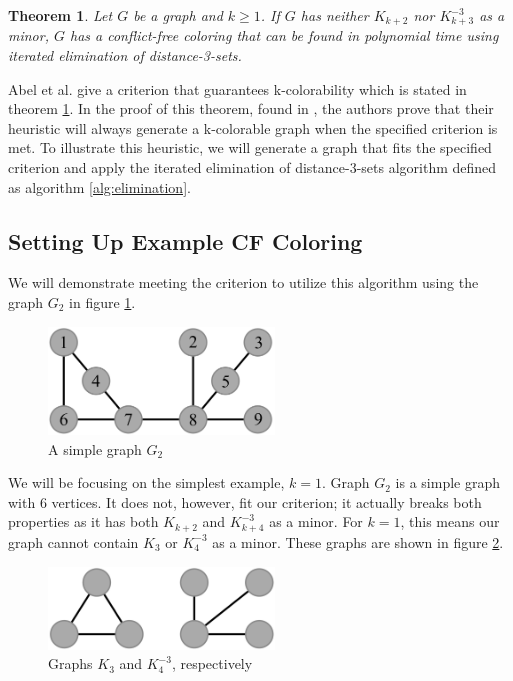 \documentclass{sig-alternate}
\newtheorem{theorem}{Theorem}
\begin{document}
\begin{theorem} \label{thm:criterion}
Let $G$ be a graph and $k \geq 1$. If $G$ has neither $K_{k+2}$ nor $K_{k+3}^{-3}$ as a minor, $G$ has a conflict-free coloring that can be found in polynomial time using iterated elimination of distance-3-sets.
\end{theorem}

Abel et al. give a criterion that guarantees k-colorability which is stated in theorem \ref{thm:criterion}. In the proof of this theorem, found in \cite{abel2017three}, the authors prove that their heuristic will always generate a k-colorable graph when the specified criterion is met. To illustrate this heuristic, we will generate a graph that fits the specified criterion and apply the iterated elimination of distance-3-sets algorithm defined as algorithm \ref{alg:elimination}.


\subsection{Setting Up Example CF Coloring}
We will demonstrate meeting the criterion to utilize this algorithm using the graph $G_2$ in figure \ref{fig:criterion}.

\begin{figure}[h]
	\centering
	\includegraphics[width=6cm]{../figures/criterion.pdf}
	\caption{A simple graph $G_2$}\label{fig:criterion}
\end{figure}

We will be focusing on the simplest example, $k = 1$. Graph $G_2$ is a simple graph with 6 vertices. It does not, however, fit our criterion; it actually breaks both properties as it has both $K_{k+2}$ and $K_{k+4}^{-3}$ as a minor. For $k = 1$, this means our graph cannot contain $K_{3}$ or $K_{4}^{-3}$ as a minor. These graphs are shown in figure \ref{fig:bad-criterion}.

\begin{figure}[h]
	\centering
	\includegraphics[width=6cm]{../figures/bad-criterion.pdf}
	\caption{Graphs $K_{3}$ and $K_{4}^{-3}$, respectively}\label{fig:bad-criterion}
\end{figure}
\end{document}
